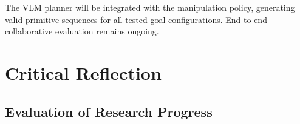 \documentclass[conference, 12pt]{IEEEtran}
\begin{document}
The VLM planner will be integrated with the manipulation policy, generating valid primitive sequences for all tested goal configurations. End-to-end collaborative evaluation remains ongoing.






\section{Critical Reflection}

\subsection{Evaluation of Research Progress}
\end{document}
